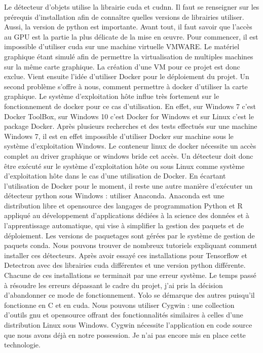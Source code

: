 \documentclass[debug,nodate,hideweeklyreports]{polytech/polytech}
\begin{document}
Le détecteur d’objets utilise la librairie \gls{cuda} et \gls{cudnn}. Il faut se renseigner sur les prérequis d’installation afin de connaître quelles versions de librairies utiliser. Aussi, la version de python est importante.
Avant tout, il faut savoir que l’accès au GPU est la partie la plus délicate de la mise en œuvre. 
Pour commencer, il est impossible d’utiliser \gls{cuda} sur une machine virtuelle VMWARE. Le matériel graphique étant simulé afin de permettre la virtualisation de multiples machines sur la même carte graphique.
La création d’une VM pour ce projet est donc exclue.
Vient ensuite l’idée d’utiliser Docker pour le déploiement du projet. Un second problème s’offre à nous, comment permettre à docker d’utiliser la carte graphique. Le système d’exploitation hôte influe très fortement sur le fonctionnement de docker pour ce cas d’utilisation. En effet, sur Windows 7 c’est Docker ToolBox, sur Windows 10 c’est Docker for Windows et sur Linux c’est le package Docker.
Après plusieurs recherches et des tests effectués sur une machine Windows 7, il est en effet impossible d’utiliser Docker sur machine sous le système d’exploitation Windows. Le conteneur linux de docker nécessite un accès complet au driver graphique or windows bride cet accès.
Un détecteur doit donc être exécuté sur le système d’exploitation hôte ou sous Linux comme système d’exploitation hôte dans le cas d’une utilisation de Docker.
En écartant l’utilisation de Docker pour le moment, il reste une autre manière d’exécuter un détecteur python sous Windows : utiliser Anaconda.
Anaconda est une distribution libre et \gls{opensource} des langages de programmation Python et R appliqué au développement d'applications dédiées à la science des données et à l'apprentissage automatique, qui vise à simplifier la gestion des paquets et de déploiement. Les versions de paquetages sont gérées par le système de gestion de paquets conda.
Nous pouvons trouver de nombreux tutoriels expliquant comment installer ces détecteurs. Après avoir essayé ces installations pour Tensorflow et Detectron avec des librairies \gls{cuda} différentes et une version python différente. Chacune de ces installations se terminait par une erreur système. Le temps passé à résoudre les erreurs dépassant le cadre du projet, j’ai pris la décision d’abandonner ce mode de fonctionnement.
Yolo se démarque des autres puisqu’il fonctionne en C et en \gls{cuda}. Nous pouvons utiliser Cygwin : une collection d'outils \gls{gnu} et \gls{opensource} offrant des fonctionnalités similaires à celles d'une distribution Linux sous Windows. Cygwin nécessite l’application en code source que nous avons déjà en notre possession. Je n’ai pas encore mis en place cette technologie.
\end{document}
